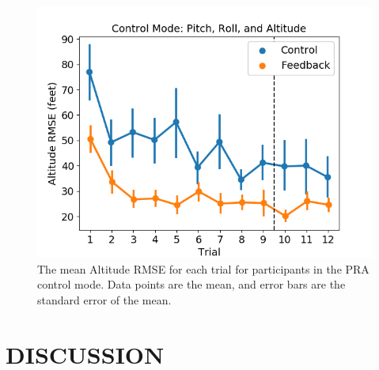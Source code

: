 \begin{figure}[b!]
    \begin{center}
        \includegraphics[width=0.8\linewidth]{figures/image5.png}
        \caption{The mean Altitude RMSE for each trial for participants in the PRA control mode. Data points are the mean, and error bars are the standard error of the mean.}
    \end{center}
\end{figure}

\section{DISCUSSION}

